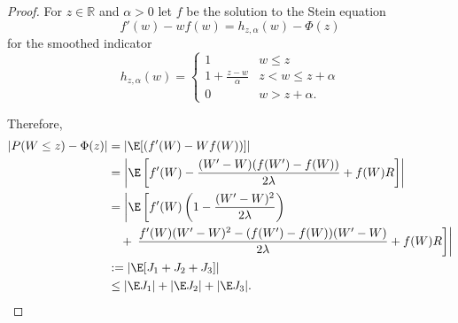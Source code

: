 \begin{proof}
  For $z \in \mathbb{R}$ and $\alpha > 0$ let $f$ be the solution to
  the Stein equation
  \begin{equation}
    f'(w) - wf(w) = h_{z,\alpha}(w) - \Phi(z)
  \end{equation}
  for the smoothed indicator
  \begin{equation}
    h_{z,\alpha}(w) =
    \begin{cases}
      1 & w \leq z \\
      1 + \frac{z-w}{\alpha} & z < w \leq z + \alpha \\
      0 & w > z + \alpha.
    \end{cases}
  \end{equation}

  Therefore,
  \begin{equation}
    \label{eq:triple-bound}
    \begin{split}
      |P(W \leq z) - \Phi(z)| &= |\E [(f'(W)-Wf(W))] | \\
      &= \left | \E \left [
          f'(W) - \frac{(W'-W)(f(W')-f(W))}{2\lambda} +f(W)R
        \right ]\right | \\
      &= \left | \E \left [f'(W)\left (1-\frac{(W'-W)^2}{2\lambda}\right) \right . \right . \\
      &\quad + \left . \left .
          \frac{f'(W)(W'-W)^2-(f(W')-f(W))(W'-W)}{2\lambda} + f(W)R
        \right ] \right | \\
      &:= | \E [J_1 + J_2 + J_3] | \\
      &\leq |\E J_1| + |\E J_2| + |\E J_3|.
    \end{split}
  \end{equation}


\end{proof}
